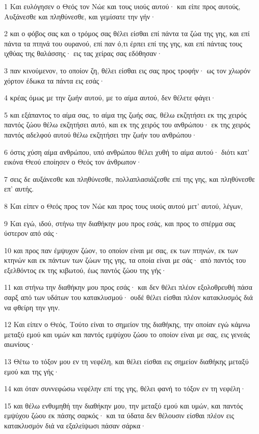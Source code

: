\par 1 Και ευλόγησεν ο Θεός τον Νώε και τους υιούς αυτού· και είπε προς αυτούς, Αυξάνεσθε και πληθύνεσθε, και γεμίσατε την γήν·
\par 2 και ο φόβος σας και ο τρόμος σας θέλει είσθαι επί πάντα τα ζώα της γης, και επί πάντα τα πτηνά του ουρανού, επί παν ό,τι έρπει επί της γης, και επί πάντας τους ιχθύας της θαλάσσης· εις τας χείρας σας εδόθησαν·
\par 3 παν κινούμενον, το οποίον ζη, θέλει είσθαι εις σας προς τροφήν· ως τον χλωρόν χόρτον έδωκα τα πάντα εις εσάς·
\par 4 κρέας όμως με την ζωήν αυτού, με το αίμα αυτού, δεν θέλετε φάγει·
\par 5 και εξάπαντος το αίμα σας, το αίμα της ζωής σας, θέλω εκζητήσει εκ της χειρός παντός ζώου θέλω εκζητήσει αυτό, και εκ της χειρός του ανθρώπου· εκ της χειρός παντός αδελφού αυτού θέλω εκζητήσει την ζωήν του ανθρώπου·
\par 6 όστις χύση αίμα ανθρώπου, υπό ανθρώπου θέλει χυθή το αίμα αυτού· διότι κατ' εικόνα Θεού εποίησεν ο Θεός τον άνθρωπον·
\par 7 σεις δε αυξάνεσθε και πληθύνεσθε, πολλαπλασιάζεσθε επί της γης, και πληθύνεσθε επ' αυτής.
\par 8 Και είπεν ο Θεός προς τον Νώε και προς τους υιούς αυτού μετ' αυτού, λέγων,
\par 9 Και εγώ, ιδού, στήνω την διαθήκην μου προς εσάς, και προς το σπέρμα σας ύστερον από σάς·
\par 10 και προς παν έμψυχον ζώον, το οποίον είναι με σας, εκ των πτηνών, εκ των κτηνών και εκ πάντων των ζώων της γης, τα οποία είναι με σάς· από παντός του εξελθόντος εκ της κιβωτού, έως παντός ζώου της γής·
\par 11 και στήνω την διαθήκην μου προς εσάς· και δεν θέλει πλέον εξολοθρευθή πάσα σαρξ από των υδάτων του κατακλυσμού· ουδέ θέλει είσθαι πλέον κατακλυσμός διά να φθείρη την γην.
\par 12 Και είπεν ο Θεός, Τούτο είναι το σημείον της διαθήκης, την οποίαν εγώ κάμνω μεταξύ εμού και υμών και παντός εμψύχου ζώου το οποίον είναι με σας, εις γενεάς αιωνίους·
\par 13 Θέτω το τόξον μου εν τη νεφέλη, και θέλει είσθαι εις σημείον διαθήκης μεταξύ εμού και της γής·
\par 14 και όταν συννεφώσω νεφέλην επί της γης, θέλει φανή το τόξον εν τη νεφέλη·
\par 15 και θέλω ενθυμηθή την διαθήκην μου, την μεταξύ εμού και υμών, και παντός εμψύχου ζώου εκ πάσης σαρκός· και τα ύδατα δεν θέλουσιν είσθαι πλέον εις κατακλυσμόν διά να εξαλείψωσι πάσαν σάρκα·
